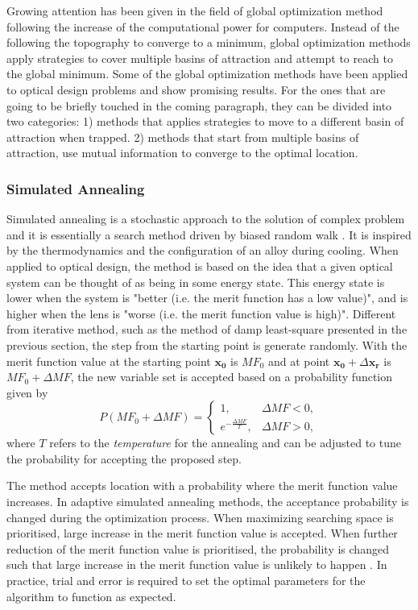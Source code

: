 Growing attention has been given in the field of global optimization method following the increase of the computational power for computers. Instead of the following the topography to converge to a minimum, global optimization methods apply strategies to cover multiple basins of attraction and attempt to reach to the global minimum. Some of the global optimization methods have been applied to optical design problems and show promising results. For the ones that are going to be briefly touched in the coming paragraph, they can be divided into two categories: 1) methods that applies strategies to move to a different basin of attraction when trapped. 2) methods that start from multiple basins of attraction, use mutual information to converge to the optimal location. 

\subsubsection{Simulated Annealing}
Simulated annealing is a stochastic approach to the solution of complex problem and it is essentially a search method driven by biased random walk \cite{WELLER:87}. It is inspired by the thermodynamics and the configuration of an alloy during cooling. When applied to optical design, the method is based on the idea that a given optical system can be thought of as being in some energy state. This energy state is lower when the system is "better (i.e. the merit function has a low value)", and is higher when the lens is "worse (i.e. the merit function value is high)". Different from iterative method, such as the method of damp least-square presented in the previous section, the step from the starting point is generate randomly. With the merit function value at the starting point $\pmb{x_0}$ is $MF_0$ and at point $\pmb{x_0} + \Delta\pmb{x_r}$ is $MF_0 + \Delta MF$, the new variable set is accepted based on a probability function \cite{Forbes1991} given by 
\begin{equation} \label{eq: simualted_annealing_probability }
P(MF_0 + \Delta MF) = 
\begin{cases}
  1, & \Delta MF < 0, \\ 
 e^{-\frac{\Delta MF}{T}}, & \Delta MF > 0,
\end{cases}
\end{equation}where $T$ refers to the \textit{temperature} for the annealing and can be adjusted to tune the probability for accepting the proposed step. 

The method accepts location with a probability where the merit function value increases. In adaptive simulated annealing methods, the acceptance probability is changed during the optimization process. When maximizing searching space is prioritised, large increase in the merit function value is accepted. When further reduction of the merit function value is prioritised, the probability is changed such that large increase in the merit function value is unlikely to happen \cite{Forbes1991}. In practice, trial and error is required to set the optimal parameters for the algorithm to function as expected.    

